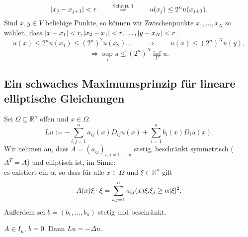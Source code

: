 \begin{beweis}
\begin{description}
		\begin{equation}
			\lvert x_j - x_{j+1}\rvert < r \qquad \stackrel{\text{Schritt }1}{\Rightarrow } \qquad u(x_j) \leq 2^n u(x_{j+1}).
		\end{equation}
		Sind $x,y \in V$ beliebige Punkte, so können wir Zwischenpunkte $x_1,\dots,x_N$ so wählen, dass $\lvert x-x_1\rvert<r, \lvert x_2-x_1\rvert<r, \dots, \lvert y-x_N\rvert<r$.
		\begin{equation}
			u(x) \leq 2^n u(x_1) \leq (2^n)^2 u(x_2) \dots \qquad \Rightarrow  \qquad u(x) \leq \left(2^n \right)^N u(y),
		\end{equation} 
		\begin{equation}
			\Rightarrow \sup_V u \leq \left( 2^n \right)^N \inf_{V}u.
		\end{equation}
	\end{description}
\end{beweis}
\subsection{Ein schwaches Maximumsprinzip für lineare elliptische Gleichungen} 
\label{sub:ein_schwaches_maximumsprinzip_fur_lineare_elliptische_gleichungen}
Sei $\Omega \subseteq \mathbb{R}^n$ offen und $x \in \Omega$.
\[
	Lu := - \sum^{n}_{i,j=1}a_{ij}(x)D_{ij}u(x) + \sum^{n}_{i=1}b_i(x)D_iu(x).
\]
Wir nehmen an, dass $A= (a_{ij})_{i,j=1,\dots,n}$ stetig, beschränkt symmetrisch ($A^T = A$) und elliptisch ist, im Sinne: \\
es existiert ein $\alpha$, so dass für alle $x \in \Omega$ und $\xi \in \mathbb{R}^n$ gilt
\[
	A(x) \xi \cdot \xi  = \sum^{n}_{i,j=1} a_{ij}(x)\xi_i\xi_j \geq \alpha \lvert\xi\rvert^2.
\]
Außerdem sei $b=(b_1,\dots,b_n)$ stetig und beschränkt.
\begin{bemerkung}
	$A \in I_n$, $b=0$. Dann $Lu= - \Delta u$.
\end{bemerkung}

